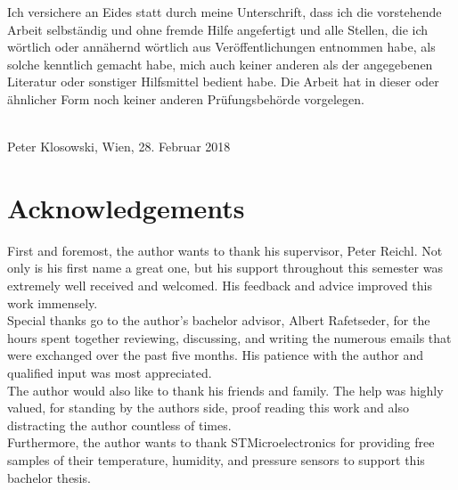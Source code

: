 \documentclass{article}      %
\begin{document}
\pagebreak

\thispagestyle{empty}
    Ich versichere an Eides statt durch meine Unterschrift, dass ich die vorstehende Arbeit selbst\"andig und ohne fremde Hilfe angefertigt und alle Stellen, die ich w\"ortlich oder ann\"ahernd  w\"ortlich  aus  Ver\"offentlichungen  entnommen  habe,  als  solche  kenntlich  gemacht  habe,  mich  auch  keiner  anderen  als  der  angegebenen  Literatur  oder  sonstiger Hilfsmittel bedient habe. Die Arbeit hat in dieser oder \"ahnlicher Form noch keiner anderen Pr\"ufungsbeh\"orde vorgelegen.

    \vspace{1.5cm}

    \noindent\makebox[2.5in]{\hrulefill}\\
    \small Peter Klosowski, Wien, 28. Februar 2018

\newpage



\section*{Acknowledgements}
%

First and foremost, the author wants to thank his supervisor, Peter Reichl. Not only is his first name a great one, but his support throughout this semester was extremely well received and welcomed. His feedback and advice improved this work immensely.
\\[1em]

Special thanks go to the author's bachelor advisor, Albert Rafetseder, for the hours spent together reviewing, discussing, and writing the numerous emails that were exchanged over the past five months. His patience with the author and qualified input was most appreciated.
\\[1em]

The author would also like to thank his friends and family. The help was highly valued, for standing by the authors side, proof reading this work and also distracting the author countless of times.
\\[1em]

Furthermore, the author wants to thank STMicroelectronics for providing free samples of their temperature, humidity, and pressure sensors to support this bachelor thesis.
\end{document}
